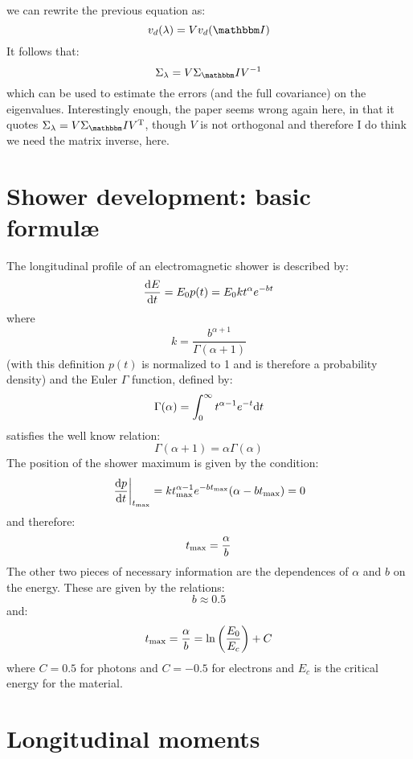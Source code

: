 \documentclass[a4paper,11pt]{article}
\newcommand{\itm}{\mathbbm I}
\newcommand{\firstder}[2]{\frac{{\rm d}#1}{{\rm d}#2}}
\newcommand{\tmax}{t_{\rm max}}
\begin{document}
we can rewrite the previous equation as:
\begin{equation}
  v_d(\lambda) = V v_d(\itm)
\end{equation}
It follows that:
\begin{equation}
\Sigma_\lambda = V \Sigma_\itm V^{-1}
\end{equation}
which can be used to estimate the errors (and the full covariance) on the
eigenvalues. Interestingly enough, the paper seems wrong again here, in that
it quotes $\Sigma_\lambda = V \Sigma_\itm V^{\rm T}$, though $V$ is not
orthogonal and therefore I do think we need the matrix inverse, here.



\section{Shower development: basic formul\ae}

The longitudinal profile of an electromagnetic shower is described by:
\begin{equation}
\firstder{E}{t} = E_0 p(t) = E_0 k t^\alpha e^{-bt}
\end{equation}
where
$$
k = \frac{b^{\alpha + 1}}{\Gamma(\alpha + 1)}
$$
(with this definition $p(t)$ is normalized to 1 and is therefore a probability
density) and the Euler $\Gamma$ function, defined by:
$$
\Gamma(\alpha) = \int_{0}^\infty t^{\alpha - 1} e^{-t} {\rm d}t
$$
satisfies the well know relation:
$$
\Gamma(\alpha + 1) = \alpha \Gamma(\alpha)
$$
The position of the shower maximum is given by the condition:
$$
\left.\firstder{p}{t}\right|_{\tmax} =
k \tmax^{\alpha - 1} e^{-b\tmax} (\alpha  - b\tmax) = 0
$$
and therefore:
\begin{equation}
\tmax = \frac{\alpha}{b}
\end{equation}
The other two pieces of necessary information are the dependences of $\alpha$
and $b$ on the energy. These are given by the relations:
\begin{equation}
b \approx 0.5
\end{equation}
and:
\begin{equation}
\tmax = \frac{\alpha}{b} = \ln\left(\frac{E_0}{E_c}\right) + C
\end{equation}
where $C=0.5$ for photons and $C=-0.5$ for electrons and $E_c$ is the critical
energy for the material.


\section{Longitudinal moments}
\end{document}
